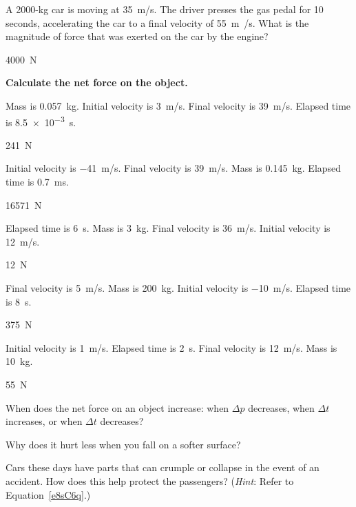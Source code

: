 \documentclass[../main-physics-problems.tex]{subfiles}
\begin{document}
\begin{questions}
\question \label{rVq3Tj}
A 2000-kg car is moving at \SI{35}{m/s}. The driver presses the gas pedal for 10 seconds, accelerating the car to a final velocity of \SI{55}{m/}s. What is the magnitude of force that was exerted on the car by the engine?

\begin{solution}
\SI{4000}{N}
\end{solution}


\textbf{Calculate the net force on the object.}

\question \label{4Me32D}
Mass is \SI{0.057}{kg}. Initial velocity is \SI{3}{m/s}. Final velocity is \SI{39}{m/s}. Elapsed time is \SI{8.5e-3}{s}.

\begin{solution}
\SI{241}{N}
\end{solution}

\question \label{LKi6tV}
Initial velocity is \SI{-41}{m/s}. Final velocity is \SI{39}{m/s}. Mass is \SI{0.145}{kg}. Elapsed time is \SI{0.7}{ms}.

\begin{solution}
\SI{16571}{N}
\end{solution}

\question \label{uWU1Cn}
Elapsed time is \SI{6}{s}. Mass is \SI{3}{kg}. Final velocity is \SI{36}{m/s}. Initial velocity is \SI{12}{m/s}.

\begin{solution}
\SI{12}{N}
\end{solution}

\question \label{2doawd}
Final velocity is \SI{5}{m/s}. Mass is \SI{200}{kg}. Initial velocity is \SI{-10}{m/s}.  Elapsed time is \SI{8}{s}.

\begin{solution}
\SI{375}{N}
\end{solution}

\question \label{I7jORB}
Initial velocity is \SI{1}{m/s}. Elapsed time is \SI{2}{s}. Final velocity is \SI{12}{m/s}.  Mass is \SI{10}{kg}.

\begin{solution}
\SI{55}{N}
\end{solution}


\question
When does the net force on an object increase: when $\Delta p$ decreases, when $\Delta t$ increases, or when $\Delta t$ decreases?


\question
Why does it hurt less when you fall on a softer surface?


\question
Cars these days have parts that can crumple or collapse in the event of an accident. How does this help protect the passengers? (\textit{Hint}: Refer to Equation~\ref{e8sC6q}.)



\end{questions}
\end{document}
